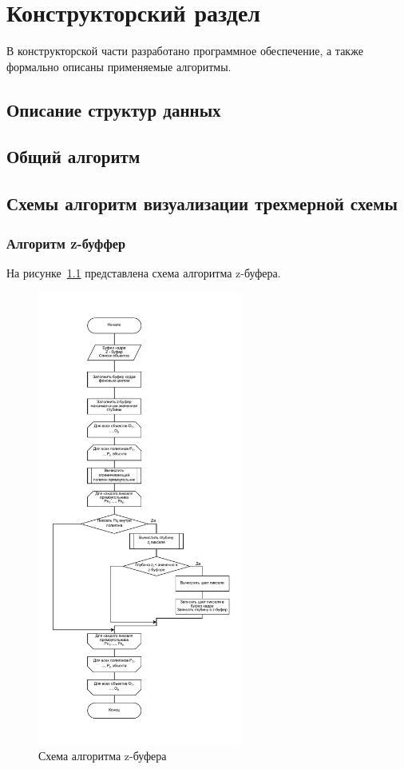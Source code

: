 \chapter{Конструкторский раздел}	
В конструкторской части разработано программное обеспечение, а также формально описаны применяемые алгоритмы.

\section{Описание структур данных}

\section{Общий алгоритм }
\section{Схемы алгоритм визуализации трехмерной схемы}
\subsection{Алгоритм z-буффер}
На рисунке~\ref{fig:z_buf} представлена схема алгоритма z-буфера.
\begin{figure}[H]
	\centering
	\includegraphics[width=0.6\textwidth, page=1]{assets/img/z-bufer.pdf}   
	\caption{Схема алгоритма z-буфера}
	\label{fig:z_buf}
\end{figure}

